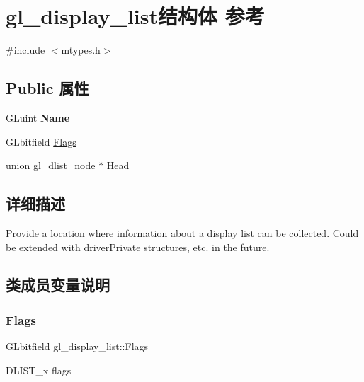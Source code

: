 \hypertarget{structgl__display__list}{}\section{gl\+\_\+display\+\_\+list结构体 参考}
\label{structgl__display__list}


{\ttfamily \#include $<$mtypes.\+h$>$}

\subsection*{Public 属性}
\begin{DoxyCompactItemize}
\item 
\mbox{\label{structgl__display__list_a1381796f78093429e82e8ec3b6c7a827}} 
G\+Luint {\bfseries Name}
\item 
G\+Lbitfield \hyperlink{structgl__display__list_ad5702429a0ad51be492d556696832558}{Flags}
\item 
union \hyperlink{uniongl__dlist__node}{gl\+\_\+dlist\+\_\+node} $\ast$ \hyperlink{structgl__display__list_a20eb6862294de84dc93101afeeb851e9}{Head}
\end{DoxyCompactItemize}


\subsection{详细描述}
Provide a location where information about a display list can be collected. Could be extended with driver\+Private structures, etc. in the future. 

\subsection{类成员变量说明}
\mbox{\label{structgl__display__list_ad5702429a0ad51be492d556696832558}} 
\subsubsection{\texorpdfstring{Flags}{Flags}}
{\footnotesize\ttfamily G\+Lbitfield gl\+\_\+display\+\_\+list\+::\+Flags}

D\+L\+I\+S\+T\+\_\+x flags \mbox{\label{structgl__display__list_a20eb6862294de84dc93101afeeb851e9}} 
